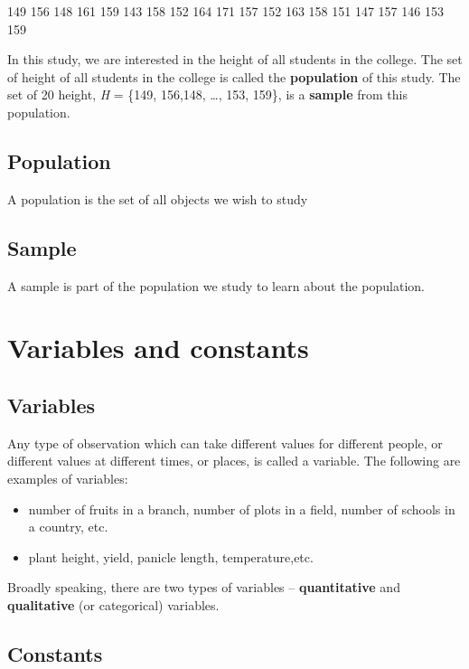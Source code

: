 \documentclass[
]{book}
\begin{document}
149 156 148 161 159 143 158 152 164 171 157 152 163 158 151 147 157 146
153 159

In this study, we are interested in the height of all students in the
college. The set of height of all students in the college is called the
\textbf{population} of this study. The set of 20 height, \emph{H} = \{149, 156,148,
\ldots, 153, 159\}, is a \textbf{sample} from this population.

\subsection{Population}\label{population}

A population is the set of all objects we wish to study

\subsection{Sample}\label{sample}

A sample is part of the population we study to learn about the
population.

\section{Variables and constants}\label{variables-and-constants}

\subsection{Variables}\label{variables}

Any type of observation which can take different values for different
people, or different values at different times, or places, is called a
variable. The following are examples of variables:

\begin{itemize}
\item
  number of fruits in a branch, number of plots in a field, number of
  schools in a country, etc.
\item
  plant height, yield, panicle length, temperature,etc.
\end{itemize}

Broadly speaking, there are two types of variables -- \textbf{quantitative}
and \textbf{qualitative} (or categorical) variables.

\subsection{Constants}\label{constants}
\end{document}
